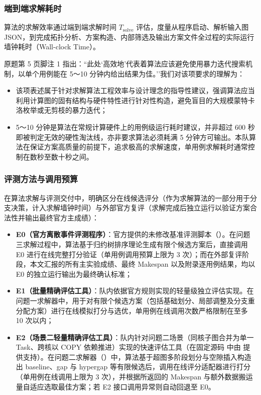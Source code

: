 \documentclass[anonymous,withtoc]{gmcm2026}
\providecommand{\tightlist}{\setlength{\itemsep}{0pt}\setlength{\parskip}{0pt}}
\begin{document}
\subsubsection{端到端求解耗时}

算法的求解效率通过端到端求解时间 \(T_{\text{solve}}\) 评估，度量从程序启动、解析输入图 JSON，到完成拓扑分析、方案构造、内部筛选及输出方案文件全过程的实际运行墙钟耗时（Wall-clock Time）。

原题第 5 页脚注 1 指出：``此处`高效地'代表着算法应该避免使用暴力迭代搜索机制，以单个用例能在 5～10 分钟内给出结果为佳。''我们对该项要求的理解为：

\begin{itemize}
\tightlist
\item
  该项表述属于针对求解算法工程效率与设计理念的指导性建议，强调算法应当利用计算图的固有结构与硬件特性进行针对性构造，避免盲目的大规模蒙特卡洛枚举或无剪枝的暴力迭代；
\item
  5～10 分钟是算法在常规计算硬件上的用例级运行耗时建议，并非超过 600 秒即被判定无效的硬性淘汰线，亦非要求算法必须耗满 5 分钟方可输出。本队算法在保证方案高质量的前提下，追求极高的求解速度，单用例求解耗时通常控制在数秒至数十秒之间。
\end{itemize}

\subsubsection{评测方法与调用预算}

在算法求解与评测交付中，明确区分在线候选评分（作为求解算法的一部分用于分支决策，计入求解墙钟时间）与外部官方复评（求解完成后独立运行以验证方案合法性并输出最终官方主成绩）：

\begin{itemize}
\tightlist
\item
  \textbf{E0（官方离散事件评测程序）}：官方提供的未修改基准评测脚本（\texttt{}）。在问题三求解过程中，算法基于归约树排序理论生成有限个候选方案后，直接调用 E0 进行在线完整打分验证（单用例调用预算上限为 3 次）；而在外部复评阶段，本文汇报的所有主实验成绩、最终 Makespan 以及附录逐用例结果，均以 E0 的独立运行输出为最终确认标准；
\item
  \textbf{E1（批量精确评估工具）}：队内依据官方规则实现的轻量级独立评估实现。在问题一求解器中，用于对有限个候选方案（包括基础划分、局部调整及分支重分配方案）进行在线模拟打分与选优，单用例在线调用次数严格限制在至多 10 次以内；
\item
  \textbf{E2（场景二轻量精确评估工具）}：队内针对问题二场景（同核子图合并为单一 Task、跨核以 COPY 依赖推进）实现的快速评估工具（在固定源码 \texttt{} 中由 \texttt{} 提供支持）。在问题二求解器（\texttt{}）中，算法基于超图多阶段划分与空隙插入构造出 baseline、gap 与 hypergap 等有限候选后，调用在线评分适配器进行打分（单用例在线调用上限为 3 次），并根据所返回的 Makespan 与额外数据搬运量自适应选取最佳方案；若 E2 接口调用异常则自动回退至 E0。
\end{itemize}
\end{document}
